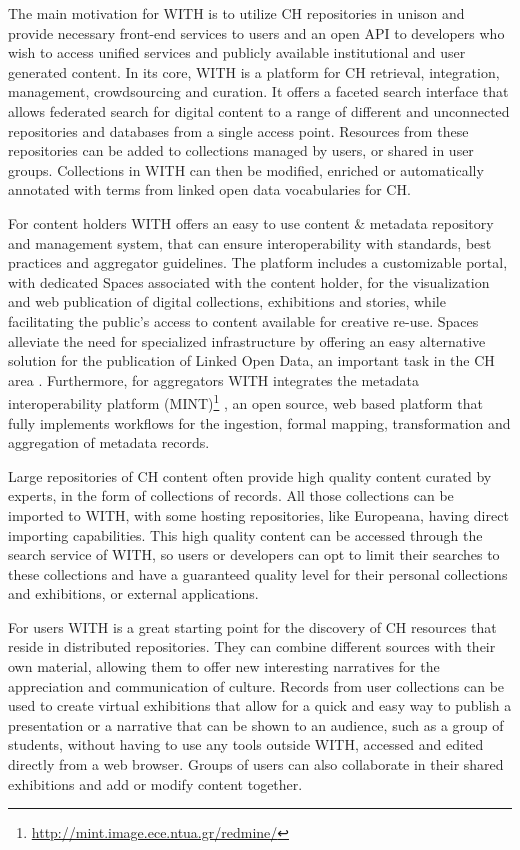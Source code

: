 \documentclass[runningheads,a4paper]{llncs}
\begin{document}
The main motivation for WITH is to utilize CH repositories in unison and provide necessary front-end services to users and an open API to developers who wish to access unified services and publicly available institutional and user generated content. In its core, WITH is a platform for CH retrieval, integration, management, crowdsourcing and curation. It offers a faceted search interface that allows federated search for digital content to a range of different and unconnected repositories and databases from a single access point. Resources from these repositories can be added to collections managed by users, or shared in user groups. Collections in WITH can then be modified, enriched or automatically annotated with terms from linked open data vocabularies for CH.

For content holders WITH offers an easy to use content \& metadata repository and management system, that can ensure interoperability with standards, best practices and aggregator guidelines. The platform includes a customizable portal, with dedicated Spaces associated with the content holder, for the visualization and web publication of digital collections, exhibitions and stories, while facilitating the public's access to content available for creative re-use. Spaces alleviate the need for specialized infrastructure by offering an easy alternative solution for the publication of Linked Open Data, an important task in the CH area  \cite{_Ref490496589}. Furthermore, for aggregators WITH integrates the metadata interoperability platform (MINT)\footnote{\url{http://mint.image.ece.ntua.gr/redmine/}} \cite{_Ref490496606}, an open source, web based platform that fully implements workflows for the ingestion, formal mapping, transformation and aggregation of metadata records.

Large repositories of CH content often provide high quality content curated by experts, in the form of collections of records. All those collections can be imported to WITH, with some hosting repositories, like Europeana, having direct importing capabilities. This high quality content can be accessed through the search service of WITH, so users or developers can opt to limit their searches to these collections and have a guaranteed quality level for their personal collections and exhibitions, or external applications. 

For users WITH is a great starting point for the discovery of CH resources that reside in distributed repositories. They can combine different sources with their own material, allowing them to offer new interesting narratives for the appreciation and communication of culture. Records from user collections can be used to create virtual exhibitions that allow for a quick and easy way to publish a presentation or a narrative that can be shown to an audience, such as a group of students, without having to use any tools outside WITH, accessed and edited directly from a web browser. Groups of users can also collaborate in their shared exhibitions and add or modify content together.
\end{document}

